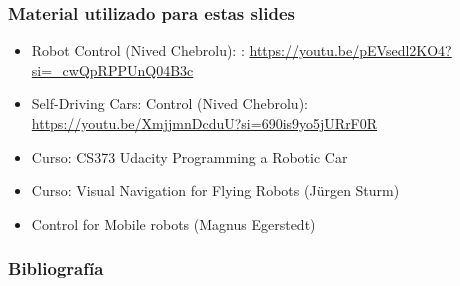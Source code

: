 \begin{frame}
    \frametitle{Material utilizado para estas slides}
    
    \begin{itemize}
        \item Robot Control (Nived Chebrolu):        : \url{https://youtu.be/pEVsedl2KO4?si=_cwQpRPPUnQ04B3c}
        \item Self-Driving Cars: Control (Nived Chebrolu): \url{https://youtu.be/XmjjmnDcduU?si=690is9yo5jURrF0R}
        \item Curso: CS373 Udacity Programming a Robotic Car
        \item Curso: Visual Navigation for Flying Robots  (J{\"u}rgen Sturm)
        \item Control for Mobile robots (Magnus Egerstedt)
    \end{itemize}
    
\end{frame}

\begin{frame}
	\frametitle{Bibliografía}
	\nocite{corke2017robotics}
	
	\printbibliography
	
\end{frame}